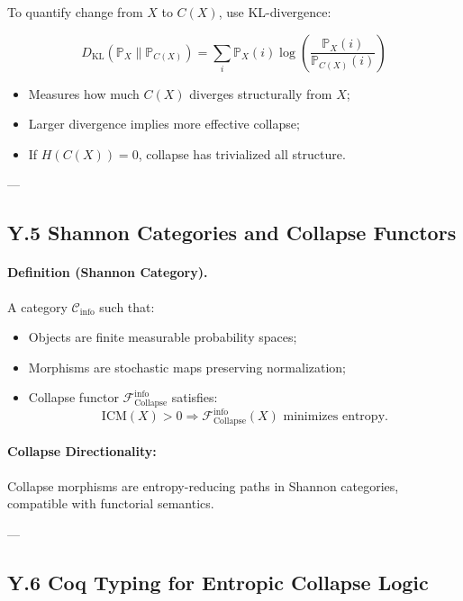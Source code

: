 \documentclass[11pt]{article}
\begin{document}
To quantify change from \( X \) to \( C(X) \), use KL-divergence:

\[
D_{\mathrm{KL}}(\mathbb{P}_X \| \mathbb{P}_{C(X)}) = \sum_{i} \mathbb{P}_X(i) \log \left( \frac{\mathbb{P}_X(i)}{\mathbb{P}_{C(X)}(i)} \right)
\]

\begin{itemize}
    \item Measures how much \( C(X) \) diverges structurally from \( X \);
    \item Larger divergence implies more effective collapse;
    \item If \( H(C(X)) = 0 \), collapse has trivialized all structure.
\end{itemize}

---

\subsection*{Y.5 Shannon Categories and Collapse Functors}

\paragraph{Definition (Shannon Category).}
A category \( \mathcal{C}_{\mathrm{info}} \) such that:
\begin{itemize}
    \item Objects are finite measurable probability spaces;
    \item Morphisms are stochastic maps preserving normalization;
    \item Collapse functor \( \mathcal{F}_{\mathrm{Collapse}}^{\mathrm{info}} \) satisfies:
    \[
    \mathrm{ICM}(X) > 0 \Rightarrow \mathcal{F}_{\mathrm{Collapse}}^{\mathrm{info}}(X) \text{ minimizes entropy.}
    \]
\end{itemize}

\paragraph{Collapse Directionality:}
Collapse morphisms are entropy-reducing paths in Shannon categories, compatible with functorial semantics.

---

\subsection*{Y.6 Coq Typing for Entropic Collapse Logic}
\end{document}
